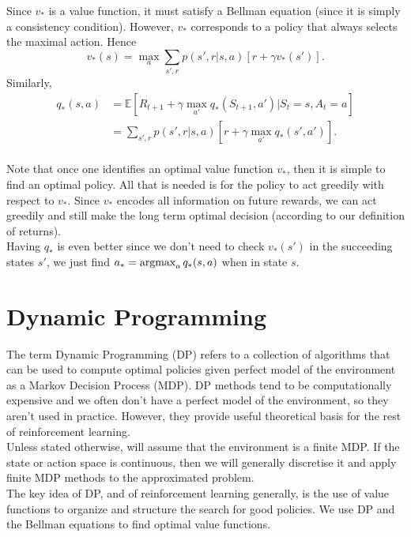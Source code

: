Since $v_*$ is a value function, it must satisfy a Bellman equation (since it is simply a consistency condition). However, $v_*$ corresponds to a policy that always selects the maximal action. Hence 
\begin{equation}
    v_*(s) = \max_a \sum_{s', r} p(s', r|s, a) [r + \gamma v_*(s')].
\end{equation}
Similarly,
\begin{align}
    q_*(s, a) &= \mathbb{E} [R_{t+1} + \gamma \max_{a'}q_*(S_{t+1}, a') | S_t=s, A_t = a]\\
              &= \sum_{s', r} p(s', r| s, a ) [r + \gamma \max_{a'}q_*(s', a')].
\end{align} \\

Note that once one identifies an optimal value function $v_*$, then it is simple to find an optimal policy. All that is needed is for the policy to act greedily with respect to $v_*$. Since $v_*$ encodes all information on future rewards, we can act greedily and still make the long term optimal decision (according to our definition of returns).\\

Having $q_*$ is even better since we don't need to check $v_*(s')$ in the succeeding states $s'$, we just find $a_* = \operatorname*{argmax}_a q_*(s, a)$ when in state $s$.

\clearpage
\section{Dynamic Programming}

The term Dynamic Programming (DP) refers to a collection of algorithms that can be used to compute optimal policies given perfect model of the environment as a Markov Decision Process (MDP). DP methods tend to be computationally expensive and we often don't have a perfect model of the environment, so they aren't used in practice. However, they provide useful theoretical basis for the rest of reinforcement learning. \\

Unless stated otherwise, will assume that the environment is a finite MDP. If the state or action space is continuous, then we will generally discretise it and apply finite MDP methods to the approximated problem.\\

The key idea of DP, and of reinforcement learning generally, is the use of value functions to organize and structure the search for good policies. We use DP and the Bellman equations to find optimal value functions. 

